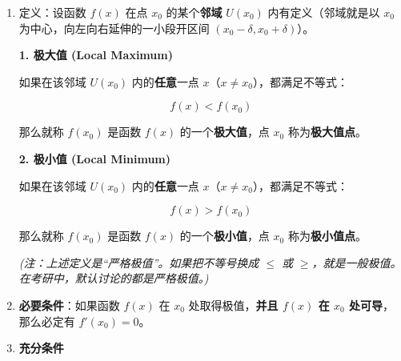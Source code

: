\documentclass[
]{article}
\begin{document}
\begin{enumerate}
\def\labelenumi{\arabic{enumi}.}
\item
  定义：设函数 \(f(x)\) 在点 \(x_0\) 的某个\textbf{邻域} \(U(x_0)\)
  内有定义（邻域就是以 \(x_0\) 为中心，向左向右延伸的一小段开区间
  \((x_0-\delta, x_0+\delta)\)）。

  \textbf{1. 极大值 (Local Maximum)}

  如果在该邻域 \(U(x_0)\) 内的\textbf{任意}一点
  \(x\)（\(x \neq x_0\)），都满足不等式：

  \[f(x) < f(x_0)\]

  那么就称 \(f(x_0)\) 是函数 \(f(x)\) 的一个\textbf{极大值}，点 \(x_0\)
  称为\textbf{极大值点}。

  \textbf{2. 极小值 (Local Minimum)}

  如果在该邻域 \(U(x_0)\) 内的\textbf{任意}一点
  \(x\)（\(x \neq x_0\)），都满足不等式：

  \[f(x) > f(x_0)\]

  那么就称 \(f(x_0)\) 是函数 \(f(x)\) 的一个\textbf{极小值}，点 \(x_0\)
  称为\textbf{极小值点}。

  \emph{(注：上述定义是``严格极值''。如果把不等号换成 \(\le\) 或
  \(\ge\)，就是一般极值。在考研中，默认讨论的都是严格极值。)}
\item
  \textbf{必要条件}：如果函数 \(f(x)\) 在 \(x_0\)
  处取得极值，\textbf{并且 \(f(x)\) 在 \(x_0\) 处可导}，那么必定有
  \textbf{\(f'(x_0) = 0\)}。
\item
  \textbf{充分条件}
\end{enumerate}
\end{document}
